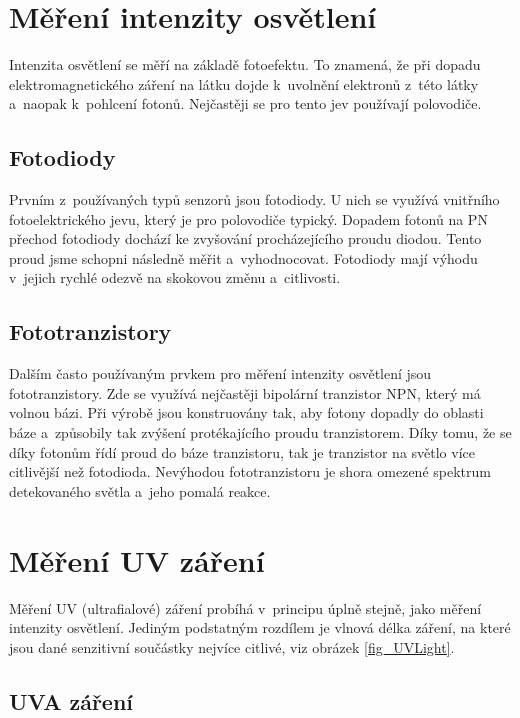 \section{Měření intenzity osvětlení}

Intenzita osvětlení se měří na základě fotoefektu. To znamená, že při dopadu elektromagnetického záření na látku dojde k~uvolnění elektronů z~této látky a~naopak k~pohlcení fotonů. Nejčastěji se pro tento jev používají polovodiče.

\subsection{Fotodiody}

Prvním z~používaných typů senzorů jsou fotodiody. U nich se využívá vnitřního fotoelektrického jevu, který je pro polovodiče typický. Dopadem fotonů na PN přechod fotodiody dochází ke zvyšování procházejícího proudu diodou. Tento proud jsme schopni následně měřit a~vyhodnocovat. Fotodiody mají výhodu v~jejich rychlé odezvě na skokovou změnu a~citlivosti.

\subsection{Fototranzistory}

Dalším často používaným prvkem pro měření intenzity osvětlení jsou fototranzistory. Zde se využívá nejčastěji bipolární tranzistor NPN, který má volnou bázi. Při výrobě jsou konstruovány tak, aby fotony dopadly do oblasti báze a~způsobily tak zvýšení protékajícího proudu tranzistorem. Díky tomu, že se díky fotonům řídí proud do báze tranzistoru, tak je tranzistor na světlo více citlivější než fotodioda. Nevýhodou fototranzistoru je shora omezené spektrum detekovaného světla a~jeho pomalá reakce.

\section{Měření UV záření}

Měření UV (ultrafialové) záření probíhá v~principu úplně stejně, jako měření intenzity osvětlení. Jediným podstatným rozdílem je vlnová délka záření, na které jsou dané senzitivní součástky nejvíce citlivé, viz obrázek \ref{fig_UVLight}. 

\subsection{UVA záření}

